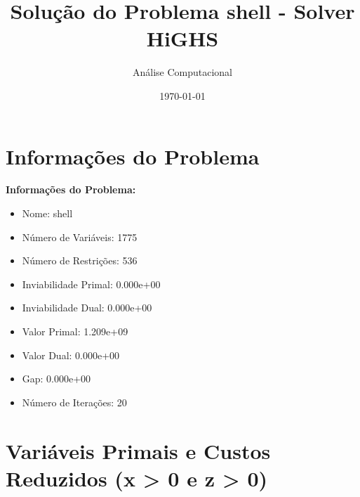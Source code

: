 \documentclass[12pt]{article}
\title{Solução do Problema shell - Solver HiGHS}
\author{Análise Computacional}
\date{\today}
\begin{document}
\maketitle

\section{Informações do Problema}

\textbf{Informações do Problema:}
\begin{itemize}
\item Nome: shell
\item Número de Variáveis: 1775
\item Número de Restrições: 536
\item Inviabilidade Primal: 0.000e+00
\item Inviabilidade Dual: 0.000e+00
\item Valor Primal: 1.209e+09
\item Valor Dual: 0.000e+00
\item Gap: 0.000e+00
\item Número de Iterações: 20
\end{itemize}


\section{Variáveis Primais e Custos Reduzidos (x > 0 e z > 0)}
\end{document}
